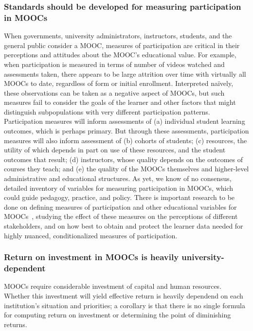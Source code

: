 \documentclass[a4paper,UKenglish]{dagman}
\begin{document}
\subsubsection*{Standards should be developed for measuring participation in MOOCs}

When governments, university administrators, instructors, students, and the general public consider
a MOOC, measures of participation are critical in their perceptions and attitudes about the MOOC's
educational value. For example, when participation is measured in terms of number of videos watched
and assessments taken, there appears to be large attrition over time with virtually all MOOCs to
date, regardless of form or initial enrollment. Interpreted na\"{i}vely, these observations can be
taken as a negative aspect of MOOCs, but such measures fail to consider the goals of the learner and
other factors that might distinguish subpopulations with very different participation patterns.
Participation measures will inform assessments of (a) individual student learning outcomes, which is
perhaps primary. But through these assessments, participation measures will also inform assessment
of (b) cohorts of students; (c) resources, the utility of which depends in part on use of these
resources, and the student outcomes that result; (d) instructors, whose quality depends on the
outcomes of courses they teach; and (e) the quality of the MOOCs themselves and higher-level
administrative and educational structures.  As yet, we know of no consensus, detailed inventory of
variables for measuring participation in MOOCs, which could guide pedagogy, practice, and policy.
There is important research to be done on defining measures of participation and other educational
variables for MOOCs~\cite{deboer-ho-reconceptualizing}, studying the effect of these measures on the
perceptions of different stakeholders, and on how best to obtain and protect the learner data needed
for highly nuanced, conditionalized measures of participation.

\subsubsection*{Return on investment in MOOCs is heavily university-dependent}

MOOCs require considerable investment of capital and human resources.  Whether this investment will
yield effective return is heavily dependend on each institution's situation and priorities; a
corollary is that there is no single formula for computing return on investment or determining the
point of diminishing returns.
\end{document}
